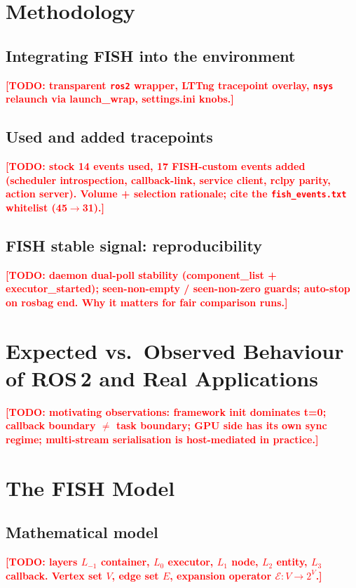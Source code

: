 \documentclass[conference]{IEEEtran}
\newcommand{\todoit}[1]{\textcolor{red}{\textbf{[TODO: #1]}}}
\begin{document}
\section{Methodology}

\subsection{Integrating FISH into the environment}
\todoit{transparent \texttt{ros2} wrapper, LTTng tracepoint overlay,
\texttt{nsys} relaunch via launch\_wrap, settings.ini knobs.}

\subsection{Used and added tracepoints}
\todoit{stock 14 events used, 17 FISH-custom events added (scheduler
introspection, callback-link, service client, rclpy parity, action
server). Volume + selection rationale; cite the
\texttt{fish\_events.txt} whitelist (45$\to$31).}

\subsection{FISH stable signal: reproducibility}
\todoit{daemon dual-poll stability (component\_list +
executor\_started); seen-non-empty / seen-non-zero guards; auto-stop
on rosbag end. Why it matters for fair comparison runs.}

\section{Expected vs.\ Observed Behaviour of ROS\,2 and Real Applications}
\todoit{motivating observations: framework init dominates t=0;
callback boundary $\neq$ task boundary; GPU side has its own
sync regime; multi-stream serialisation is host-mediated in
practice.}

\section{The FISH Model}

\subsection{Mathematical model}
\todoit{layers $L_{-1}$ container, $L_0$ executor, $L_1$ node,
$L_2$ entity, $L_3$ callback. Vertex set $V$, edge set $E$, expansion
operator $\mathcal{E}: V \to 2^V$.}
\end{document}
